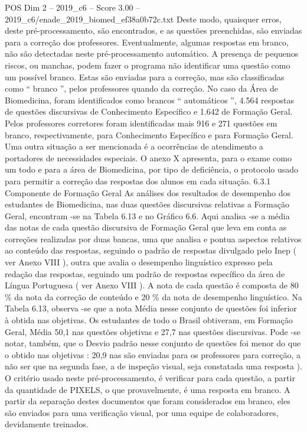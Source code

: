 \begin{textsample}{POS Dim 2 – 2019\_c6 – Score 3.00 – 2019\_c6/enade\_2019\_biomed\_ef38a0b72c.txt}
Deste modo, quaisquer erros, deste pré-processamento, são encontrados, e as questões preenchidas, são enviadas para a correção dos professores.
Eventualmente, algumas respostas em branco, não são detectadas neste pré-processamento automático.
A presença de pequenos riscos, ou manchas, podem fazer o programa não identificar uma questão como um possível branco.
Estas são enviadas para a correção, mas são classificadas como “ branco ”, pelos professores quando da correção.
No caso da Área de Biomedicina, foram identificados como brancos “ automáticos ”, 4.564 respostas de questões discursivas de Conhecimento Específico e 1.642 de Formação Geral.
Pelos professores corretores foram identificadas mais 916 e 271 questões em branco, respectivamente, para Conhecimento Específico e para Formação Geral.
Uma outra situação a ser mencionada é a ocorrências de atendimento a portadores de necessidades especiais.
O anexo X apresenta, para o exame como um todo e para a área de Biomedicina, por tipo de deficiência, o protocolo usado para permitir a correção das respostas dos alunos em cada situação. 6.3.1 Componente de Formação Geral As análises dos resultados de desempenho dos estudantes de Biomedicina, nas duas questões discursivas relativas a Formação Geral, encontram -se na Tabela 6.13 e no Gráfico 6.6.
Aqui analisa -se a média das notas de cada questão discursiva de Formação Geral que leva em conta as correções realizadas por duas bancas, uma que analisa e pontua aspectos relativos ao conteúdo das respostas, seguindo o padrão de respostas divulgado pelo Inep ( ver Anexo VIII ), outra que avalia o desempenho linguístico expresso pela redação das respostas, seguindo um padrão de respostas específico da área de Língua Portuguesa ( ver Anexo VIII ).
A nota de cada questão é composta de 80 \% da nota da correção de conteúdo e 20 \% da nota de desempenho linguístico.
Na Tabela 6.13, observa -se que a nota Média nesse conjunto de questões foi inferior à obtida nas objetivas.
Os estudantes de todo o Brasil obtiveram, em Formação Geral, Média 50,1 nas questões objetivas e 27,7 nas questões discursivas.
Pode -se notar, também, que o Desvio padrão nesse conjunto de questões foi menor do que o obtido nas objetivas : 20,9 nas são enviadas para os professores para correção, a não ser que na segunda fase, a de inspeção visual, seja constatada uma resposta ).
O critério usado neste pré-processamento, é verificar para cada questão, a partir da quantidade de PIXELS, o que provavelmente, é uma resposta em branco.
A partir da separação destes documentos que foram considerados em branco, eles são enviados para uma verificação visual, por uma equipe de colaboradores, devidamente treinados.

\end{textsample}
